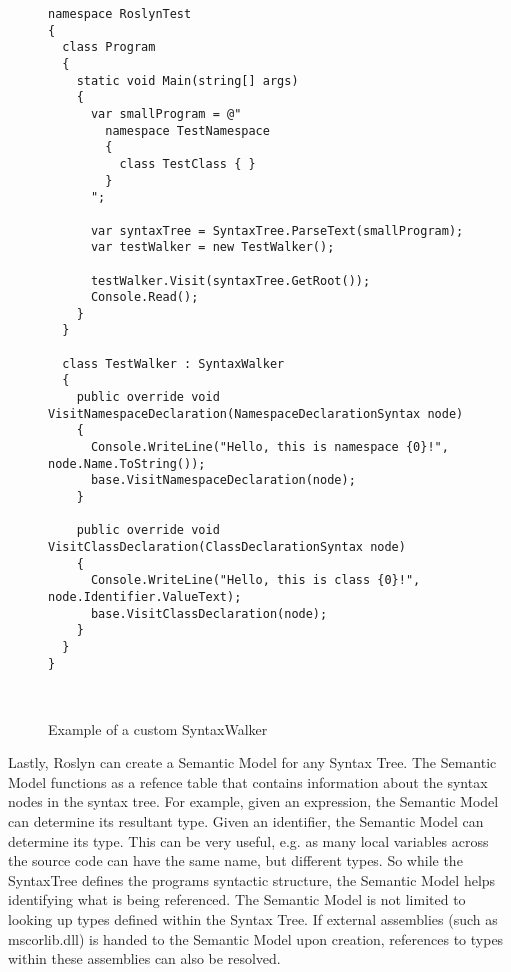 	\begin{figure}
		\begin{center}
			
		\begin{lstlisting}[language=CSharp,classoffset=1,morekeywords={Program,SyntaxTree,TestWalker,Console,SyntaxWalker,NamespaceDeclarationSyntax,ClassDeclarationSyntax}]
namespace RoslynTest
{
  class Program
  {
    static void Main(string[] args)
    {
      var smallProgram = @"
        namespace TestNamespace 
        {
          class TestClass { }
        }
      ";

      var syntaxTree = SyntaxTree.ParseText(smallProgram);
      var testWalker = new TestWalker();

      testWalker.Visit(syntaxTree.GetRoot());
      Console.Read();
    }
  }

  class TestWalker : SyntaxWalker
  {
    public override void VisitNamespaceDeclaration(NamespaceDeclarationSyntax node)
    {
      Console.WriteLine("Hello, this is namespace {0}!", node.Name.ToString());
      base.VisitNamespaceDeclaration(node);
    }

    public override void VisitClassDeclaration(ClassDeclarationSyntax node)
    {
      Console.WriteLine("Hello, this is class {0}!", node.Identifier.ValueText);
      base.VisitClassDeclaration(node);
    }
  }
}



		\end{lstlisting}
		\end{center}
		\caption{Example of a custom SyntaxWalker}
		\label{fig:roslyn_walker_example}
	\end{figure}

	Lastly, Roslyn can create a Semantic Model for any Syntax Tree. The Semantic Model functions as a refence table that contains information about the syntax nodes in the syntax tree. For example, given an expression, the Semantic Model can determine its resultant type. Given an identifier, the Semantic Model can determine its type. This can be very useful, e.g. as many local variables across the source code can have the same name, but different types. So while the SyntaxTree defines the programs syntactic structure, the Semantic Model helps identifying what is being referenced. The Semantic Model is not limited to looking up types defined within the Syntax Tree. If external assemblies (such as mscorlib.dll) is handed to the Semantic Model upon creation, references to types within these assemblies can also be resolved.

\FloatBarrier
